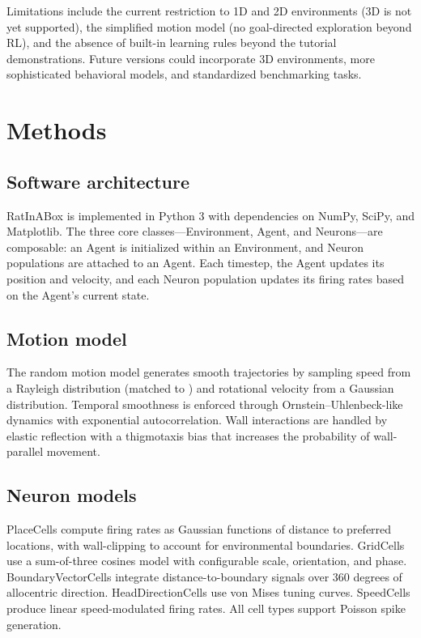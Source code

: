 \documentclass[11pt]{article}
\begin{document}
Limitations include the current restriction to 1D and 2D environments (3D is not yet supported), the simplified motion model (no goal-directed exploration beyond RL), and the absence of built-in learning rules beyond the tutorial demonstrations. Future versions could incorporate 3D environments, more sophisticated behavioral models, and standardized benchmarking tasks.

\section{Methods}

\subsection{Software architecture}

RatInABox is implemented in Python 3 with dependencies on NumPy, SciPy, and Matplotlib. The three core classes---Environment, Agent, and Neurons---are composable: an Agent is initialized within an Environment, and Neuron populations are attached to an Agent. Each timestep, the Agent updates its position and velocity, and each Neuron population updates its firing rates based on the Agent's current state.

\subsection{Motion model}

The random motion model generates smooth trajectories by sampling speed from a Rayleigh distribution (matched to \citet{sargolini2006conjunctive}) and rotational velocity from a Gaussian distribution. Temporal smoothness is enforced through Ornstein--Uhlenbeck-like dynamics with exponential autocorrelation. Wall interactions are handled by elastic reflection with a thigmotaxis bias that increases the probability of wall-parallel movement.

\subsection{Neuron models}

PlaceCells compute firing rates as Gaussian functions of distance to preferred locations, with wall-clipping to account for environmental boundaries. GridCells use a sum-of-three cosines model with configurable scale, orientation, and phase. BoundaryVectorCells integrate distance-to-boundary signals over 360 degrees of allocentric direction. HeadDirectionCells use von Mises tuning curves. SpeedCells produce linear speed-modulated firing rates. All cell types support Poisson spike generation.
\end{document}
